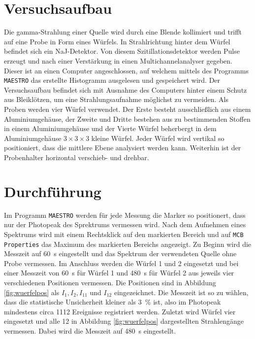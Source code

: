 \newpage
\section{Versuchsaufbau}
\label{sec:Aufbau}

Die gamma-Strahlung einer 
Quelle wird durch eine Blende kollimiert und trifft auf eine Probe in Form
eines Würfels.
In Strahlrichtung hinter dem Würfel befindet sich ein NaJ-Detektor.
Von diesem Szitillationsdetektor werden Pulse erzeugt
und nach einer Verstärkung in einen Multichannelanalyser gegeben.
Dieser ist an einen Computer angeschlossen,
auf welchem mittels des Programms \texttt{MAESTRO}
das erstellte Histogramm ausgelesen und gespeichert wird.
Der Versuchsaufbau befindet sich mit Ausnahme des Computers hinter einem
Schutz aus Bleiklötzen, um eine Strahlungsaufnahme möglichst zu vermeiden.
Als Proben werden vier Würfel verwendet.
Der Erste besteht ausschließlich aus einem Aluminiumgehäuse, der Zweite und Dritte
bestehen aus zu bestimmenden Stoffen in einem Aluminiumgehäuse
und der Vierte Würfel beherbergt in dem Aluminiumgehäuse $3 \times 3 \times 3$
kleine Würfel.
Jeder Würfel wird vertikal so positioniert, dass die mittlere Ebene analysiert
werden kann. Weiterhin ist der Probenhalter horizontal verschieb- und drehbar.

\section{Durchführung}
\label{sec:Durchführung}

Im Programm \texttt{MAESTRO} werden für jede Messung die Marker so positionert,
dass nur der Photopeak des Sprektrums vermessen wird.
Nach dem Aufnehmen eines Spektrums
wird mit einem Rechtsklick auf den markierten Bereich und auf
\texttt{MCB Properties} das Maximum des markierten Bereichs angezeigt.
Zu Beginn wird die Messzeit auf \SI{60}{\second} eingestellt und das Spektrum
der verwendeten Quelle ohne Probe vermessen. Im Anschluss werden die
Würfel \num{1} und \num{2} eingesetzt und bei einer Messzeit von
\SI{60}{\second} für Würfel \num{1} und \SI{480}{\second} für Würfel \num{2}
aus jeweils vier verschiedenen Positionen vermessen. Die Positionen sind
in Abbildung \ref{fig:wuerfelpos} als
$I_{1}, I_{2}, I_{11}$ und $I_{12}$ eingezeichnet.
Die Messzeit ist so zu wählen, dass die statistische Unsicherheit kleiner
als \SI{3}{\percent} ist, also im Photopeak mindestens circa \num{1112}
Ereignisse registriert werden.
Zuletzt wird Würfel vier eingesetzt und alle \num{12} in Abbildung
\ref{fig:wuerfelpos} dargestellten Strahlengänge vermessen. Dabei wird die
Messzeit auf \SI{480}{\second} eingestellt.

